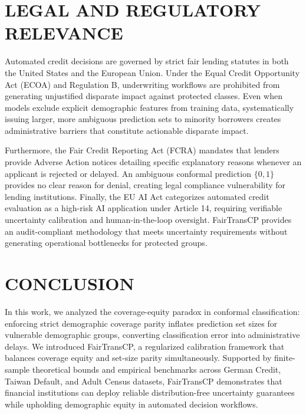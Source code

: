 \documentclass[twoside]{article}
\begin{document}
\section{LEGAL AND REGULATORY RELEVANCE}
Automated credit decisions are governed by strict fair lending statutes in both the United States and the European Union. Under the Equal Credit Opportunity Act (ECOA) and Regulation B, underwriting workflows are prohibited from generating unjustified disparate impact against protected classes. Even when models exclude explicit demographic features from training data, systematically issuing larger, more ambiguous prediction sets to minority borrowers creates administrative barriers that constitute actionable disparate impact.

Furthermore, the Fair Credit Reporting Act (FCRA) mandates that lenders provide Adverse Action notices detailing specific explanatory reasons whenever an applicant is rejected or delayed. An ambiguous conformal prediction $\{0, 1\}$ provides no clear reason for denial, creating legal compliance vulnerability for lending institutions. Finally, the EU AI Act categorizes automated credit evaluation as a high-risk AI application under Article 14, requiring verifiable uncertainty calibration and human-in-the-loop oversight. FairTransCP provides an audit-compliant methodology that meets uncertainty requirements without generating operational bottlenecks for protected groups.

\section{CONCLUSION}
In this work, we analyzed the coverage-equity paradox in conformal classification: enforcing strict demographic coverage parity inflates prediction set sizes for vulnerable demographic groups, converting classification error into administrative delays. We introduced FairTransCP, a regularized calibration framework that balances coverage equity and set-size parity simultaneously. Supported by finite-sample theoretical bounds and empirical benchmarks across German Credit, Taiwan Default, and Adult Census datasets, FairTransCP demonstrates that financial institutions can deploy reliable distribution-free uncertainty guarantees while upholding demographic equity in automated decision workflows.


\end{document}
